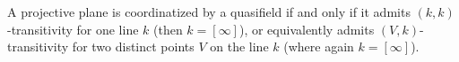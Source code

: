 A projective plane is coordinatized by a quasifield if and only if it admits $(k,k)$-transitivity for one line $k$ (then $k = [\infty]$), or equivalently admits $(V,k)$-transitivity for two distinct points $V$ on the line $k$ (where again $k = [\infty]$).
